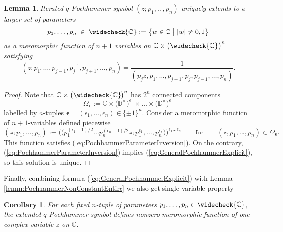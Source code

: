 \documentclass{amsart}
\newtheorem{lemma}[theorem]{Lemma}
\newtheorem{corollary}[theorem]{Corollary}
\begin{document}
\begin{lemma}
Iterated $q$-Pochhammer symbol $(z;p_1,\dots,p_n)$ uniquely extends to a larger set of parameters
\begin{equation*}
p_1,\dots,p_n\;\in\;\widecheck{\mathbb C}:=\big\{w\in\mathbb C\;\big|\;|w|\neq0,1\big\}
\end{equation*}
as a meromorphic function of $n+1$ variables on $\mathbb C\times\big(\widecheck{\mathbb C}\big)^n$ satisfying
\begin{equation}
(z;p_1,\dots,p_{j-1},p_j^{-1},p_{j+1},\dots,p_n)=\frac1{(p_j z,p_1,\dots,p_{j-1},p_j,p_{j+1},\dots,p_n)}.
\label{eq:PochhammerParameterInversion}
\end{equation}
\end{lemma}
\begin{proof}
Note that $\mathbb C\times\big(\widecheck{\mathbb C}\big)^n$ has $2^n$ connected components
\begin{equation}
\Omega_{\boldsymbol\epsilon}:=\mathbb C\times\big(\mathbb D^\times\big)^{\epsilon_1}\times\dots\times\big(\mathbb D^{\times}\big)^{\epsilon_1}
\label{eq:ConnectedComponentsOmegaEpsilon}
\end{equation}
labelled by $n$-tuples $\boldsymbol\epsilon=(\epsilon_1,\dots,\epsilon_n)\in \{\pm1\}^n$. Consider a meromorphic function of $n+1$-variables defined piecewise
\begin{equation}
(z;p_1,\dots,p_n):=\Big(\big(p_1^{(\epsilon_1-1)/2}\dots p_n^{(\epsilon_n-1)/2}z;p_1^{\epsilon_1},\dots,p_n^{\epsilon_n}\big)\Big)^{\epsilon_1\dots\epsilon_n}\qquad\textrm{for}\qquad (z,p_1,\dots,p_n)\in\Omega_{\boldsymbol\epsilon}.
\label{eq:GeneralPochhammerExplicit}
\end{equation}
This function satisfies (\ref{eq:PochhammerParameterInversion}). On the contrary, (\ref{eq:PochhammerParameterInversion}) implies (\ref{eq:GeneralPochhammerExplicit}), so this solution is unique.
\end{proof}

Finally, combining formula (\ref{eq:GeneralPochhammerExplicit}) with Lemma \ref{lemm:PochhammerNonConstantEntire} we also get single-variable property
\begin{corollary}
    For each fixed $n$-tuple of parameters $p_1,\dots,p_n\in\widecheck{\mathbb C}$, the extended $q$-Pochhammer symbol defines nonzero meromorphic function of one complex variable $z$ on $\mathbb C$.
    \label{cor:qPochhammerNonzeroMeromorphicFunctionOfOneVariable}
\end{corollary}
\end{document}
